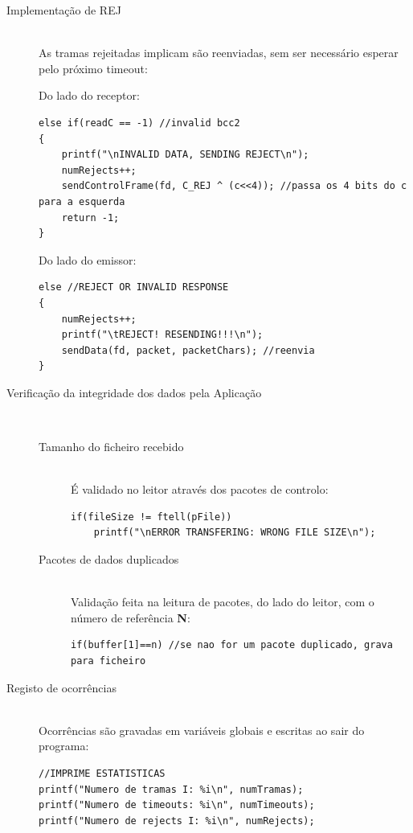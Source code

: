 \documentclass[a4paper,11pt]{article}
\begin{document}
\begin{description}
\item[Implementação de REJ] \hfill \\
As tramas rejeitadas implicam são reenviadas, sem ser necessário esperar pelo próximo timeout:

Do lado do receptor:
\begin{lstlisting}
else if(readC == -1) //invalid bcc2
{
    printf("\nINVALID DATA, SENDING REJECT\n");
    numRejects++;
    sendControlFrame(fd, C_REJ ^ (c<<4)); //passa os 4 bits do c para a esquerda
    return -1;
}
\end{lstlisting}
	Do lado do emissor:
\begin{lstlisting}
else //REJECT OR INVALID RESPONSE
{
    numRejects++;
    printf("\tREJECT! RESENDING!!!\n");
    sendData(fd, packet, packetChars); //reenvia
}
\end{lstlisting}

\pagebreak

\item[Verificação da integridade dos dados pela Aplicação] \hfill \\
\begin{description}
\item[Tamanho do ficheiro recebido] \hfill \\
É validado no leitor através dos pacotes de controlo:
\begin{lstlisting}
if(fileSize != ftell(pFile))
    printf("\nERROR TRANSFERING: WRONG FILE SIZE\n");
\end{lstlisting}

\item[Pacotes de dados duplicados] \hfill \\
Validação feita na leitura de pacotes, do lado do leitor, com o número de referência \textbf{N}:

\begin{lstlisting}
if(buffer[1]==n) //se nao for um pacote duplicado, grava para ficheiro
\end{lstlisting}

\end{description}

\item[Registo de ocorrências] \hfill \\
Ocorrências são gravadas em variáveis globais e escritas ao sair do programa:

\begin{lstlisting}
//IMPRIME ESTATISTICAS
printf("Numero de tramas I: %i\n", numTramas);
printf("Numero de timeouts: %i\n", numTimeouts);
printf("Numero de rejects I: %i\n", numRejects);
\end{lstlisting}

\end{description}
\end{document}
